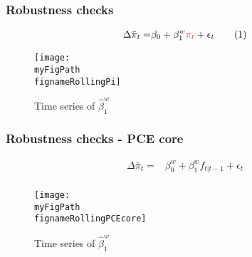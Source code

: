 \documentclass[10pt]{beamer}
\def \myFigPath {../../../figures/}
\def\fignameRollingPi{rolling_overlapping_pi_command_anchoring_in_data_individual_25_Sep_2020_10_37_43} %
\def\fignameRollingPCEcore{rolling_overlapping_pce_core_command_anchoring_in_data_individual_PCE_20_Oct_2020_11_16_01}
\begin{document}
\begin{frame}[plain]  %
\frametitle{Robustness checks}
\label{further_evidence}

\begin{align*}
\Delta\bar{\pi}_t = & \beta_0 + \beta^w_1\textcolor{brownreddark}{\pi_t} + \epsilon_t \tag{1} \\
\end{align*}

\vspace{-0.7cm}

\begin{figure}[h!]
\texttt{[image: \\myFigPath \\fignameRollingPi]}
\caption{Time series of $\hat{\beta}_1^w$}
\label{rollingPi}
\end{figure}


\vfill
\vspace{-0.9cm}

\hyperlink{rolling}{}	\end{frame}

\begin{frame}[plain]  %
\frametitle{Robustness checks - PCE core}

\begin{align*}
\Delta\bar{\pi}_t = & \beta^w_0+ \beta^w_1f_{t|t-1} + \epsilon_t \tag{1} \\
\end{align*}

\vspace{-0.7cm}

\begin{figure}[h!]
\texttt{[image: \\myFigPath \\fignameRollingPCEcore]}
\caption{Time series of $\hat{\beta}_1^w$}
\label{rollingPi}
\end{figure}


\vfill
\vspace{-0.9cm}

\hyperlink{rolling}{}	\end{frame}
\end{document}
